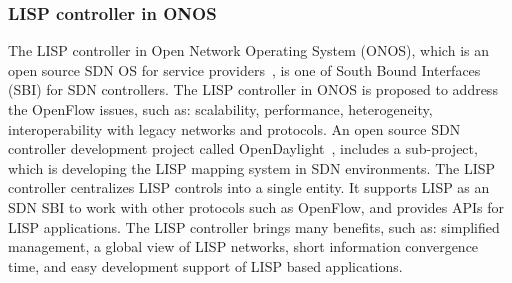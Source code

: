 \subsubsection{LISP controller in ONOS}
\label{subsubsec:implementation_onos}
The LISP controller in Open Network Operating System (ONOS), which is an open source SDN OS for service providers~\cite{han2016design}, is one of South Bound Interfaces (SBI) for SDN controllers. The LISP controller in ONOS is proposed to address the OpenFlow issues, such as: scalability, performance, heterogeneity, interoperability with legacy networks and protocols. An open source SDN controller development project called OpenDaylight~\cite{OpenDaylight}, includes a sub-project, which is developing the LISP mapping system in SDN environments. The LISP controller centralizes LISP controls into a single entity. It supports LISP as an SDN SBI to work with other protocols such as OpenFlow, and provides APIs for LISP applications. %
The LISP controller brings many benefits, such as: simplified management, a global view of LISP networks, short information convergence time, and easy development support of LISP based applications. 

